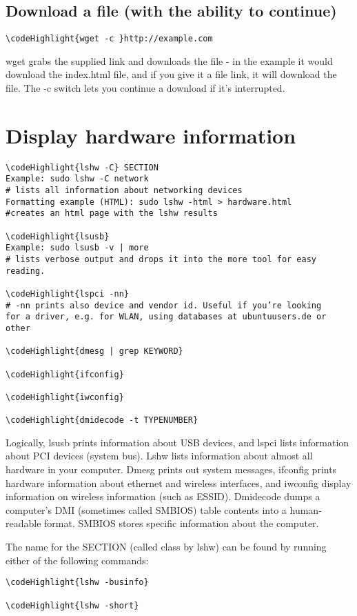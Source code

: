 \documentclass[12pt,a4paper]{article}
\begin{document}
\subsection{Download a file (with the ability to continue)}
\begin{Verbatim}[commandchars=\\\{\}]
\codeHighlight{wget -c }http://example.com
\end{Verbatim}
wget grabs the supplied link and downloads the file - in the example it would download the index.html file, and if you give it a file link, it will download the file.  The -c switch lets you continue a download if it's interrupted.

\section{Display hardware information}
\label{Display hardware information}
\begin{Verbatim}[commandchars=\\\{\}]
\codeHighlight{lshw -C} SECTION
Example: sudo lshw -C network
# lists all information about networking devices
Formatting example (HTML): sudo lshw -html > hardware.html
#creates an html page with the lshw results

\codeHighlight{lsusb}
Example: sudo lsusb -v | more
# lists verbose output and drops it into the more tool for easy reading.

\codeHighlight{lspci -nn}
# -nn prints also device and vendor id. Useful if you’re looking
for a driver, e.g. for WLAN, using databases at ubuntuusers.de or other

\codeHighlight{dmesg | grep KEYWORD}

\codeHighlight{ifconfig}

\codeHighlight{iwconfig}

\codeHighlight{dmidecode -t TYPENUMBER}
\end{Verbatim}
Logically, lsusb prints information about USB devices, and lspci lists information about PCI devices (system bus). Lshw lists information about almost all hardware in your computer. Dmesg prints out system messages, ifconfig prints hardware information about ethernet and wireless interfaces, and iwconfig display information on wireless information (such as ESSID). Dmidecode dumps a computer's DMI (sometimes called SMBIOS) table contents into a human-readable format. SMBIOS stores specific information about the computer.

The name for the SECTION (called class by lshw) can be found by running either of the following commands:
\begin{Verbatim}[commandchars=\\\{\}]
\codeHighlight{lshw -businfo}

\codeHighlight{lshw -short}
\end{Verbatim}
\end{document}
